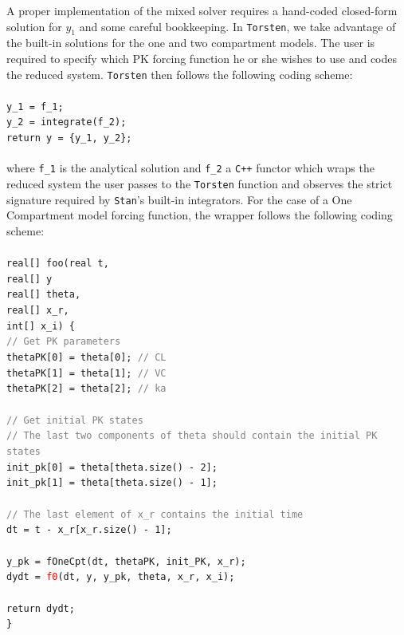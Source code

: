 \documentclass[11pt]{article}
\begin{document}
A proper implementation of the mixed solver requires a hand-coded closed-form solution for $y_1$ 
and some careful bookkeeping. In \texttt{Torsten}, we take advantage of the built-in solutions for the one and 
two compartment models. The user is required
to specify which PK forcing function he or she wishes to use and codes the reduced system. 
\texttt{Torsten} then follows the following coding scheme: \\ \\
%
\texttt{y\_1 = f\_1; \\
y\_2 = integrate(f\_2); \\
return y = \{y\_1, y\_2\}; \\
  } \\
%
where \texttt{f\_1} is the analytical solution and \texttt{f\_2} a \texttt{C++} functor which wraps the reduced
system the user passes to the \texttt{Torsten} function and observes the strict signature required by \texttt{Stan}'s
built-in integrators. For the case of a One Compartment model forcing function, the wrapper follows 
the following coding scheme: \\ \\
%
\texttt{real[] foo(real t, \\
\phantom{real[] foo(}real[] y \\
\phantom{real[] foo(}real[] theta,  \\
\phantom{real[] foo(}real[] x\_r, \\
\phantom{real[] foo(}int[] x\_i) \{ \\
%
 \phantom{  } \textcolor{gray}{// Get PK parameters} \\
 \phantom{  } thetaPK[0] = theta[0];  \textcolor{gray}{// CL} \\
 \phantom{  } thetaPK[1] = theta[1];  \textcolor{gray}{// VC} \\
 \phantom{  } thetaPK[2] = theta[2];  \textcolor{gray}{// ka} \\ \ \\
% 
 \phantom{  } \textcolor{gray}{// Get initial PK states} \\
 \phantom{  } \textcolor{gray}{// The last two components of theta should contain the initial PK states} \\
 \phantom{  }  init\_pk[0] = theta[theta.size() - 2]; \\
 \phantom{  }  init\_pk[1] = theta[theta.size() - 1]; \\ \ \\
%  
 \phantom{  }  \textcolor{gray}{// The last element of x\_r contains the initial time} \\
 \phantom{  }  dt = t - x\_r[x\_r.size() - 1]; \\ \ \\
% 
 \phantom{  }  y\_pk = fOneCpt(dt, thetaPK, init\_PK, x\_r); \\
 \phantom{  }  dydt = \textcolor{red}{f0}(dt, y, y\_pk, theta, x\_r, x\_i); \\ \ \\
%  
 \phantom{  }  return dydt; \\
\}
} \\ \\
\end{document}
